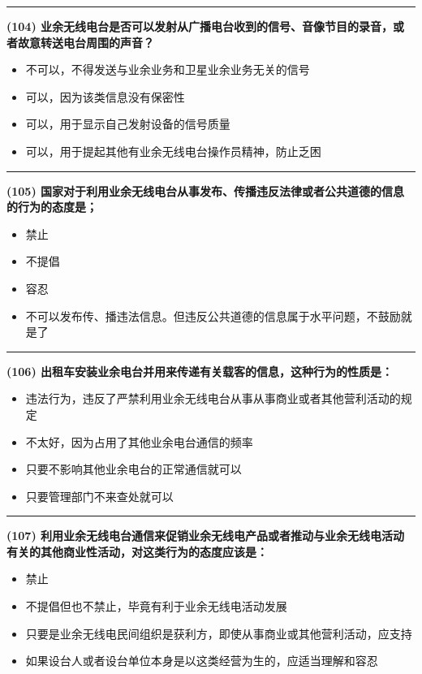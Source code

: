 \documentclass[twocolumn]{ctexart}  %
\begin{document}
\noindent\rule{0.5\textwidth}{1pt}
\heiti \textbf{(104) 业余无线电台是否可以发射从广播电台收到的信号、音像节目的录音，或者故意转送电台周围的声音？} \songti {\color{gray} [LK0068] }
\begin{itemize}
	\item  不可以，不得发送与业余业务和卫星业余业务无关的信号
	\item  可以，因为该类信息没有保密性
	\item  可以，用于显示自己发射设备的信号质量
	\item  可以，用于提起其他有业余无线电台操作员精神，防止乏困
\end{itemize}


\noindent\rule{0.5\textwidth}{1pt}
\heiti \textbf{(105) 国家对于利用业余无线电台从事发布、传播违反法律或者公共道德的信息的行为的态度是；} \songti {\color{gray} [LK0069] }
\begin{itemize}
	\item  禁止
	\item  不提倡
	\item  容忍
	\item  不可以发布传、播违法信息。但违反公共道德的信息属于水平问题，不鼓励就是了
\end{itemize}


\noindent\rule{0.5\textwidth}{1pt}
\heiti \textbf{(106) 出租车安装业余电台并用来传递有关载客的信息，这种行为的性质是：} \songti {\color{gray} [LK0070] }
\begin{itemize}
	\item  违法行为，违反了严禁利用业余无线电台从事从事商业或者其他营利活动的规定
	\item  不太好，因为占用了其他业余电台通信的频率
	\item  只要不影响其他业余电台的正常通信就可以
	\item  只要管理部门不来查处就可以
\end{itemize}


\noindent\rule{0.5\textwidth}{1pt}
\heiti \textbf{(107) 利用业余无线电台通信来促销业余无线电产品或者推动与业余无线电活动有关的其他商业性活动，对这类行为的态度应该是：} \songti {\color{gray} [LK0071] }
\begin{itemize}
	\item  禁止
	\item  不提倡但也不禁止，毕竟有利于业余无线电活动发展
	\item  只要是业余无线电民间组织是获利方，即使从事商业或其他营利活动，应支持
	\item  如果设台人或者设台单位本身是以这类经营为生的，应适当理解和容忍
\end{itemize}
\end{document}
